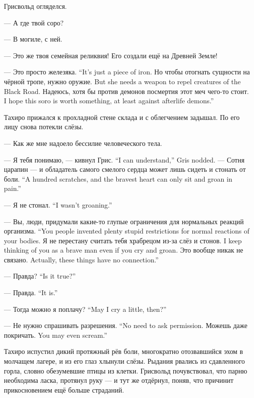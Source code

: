 Грисвольд огляделся.

--- А где твой соро?

--- В могиле, с ней.

--- Это же твоя семейная реликвия!
Его создали ещё на Древней Земле!

{--- Это просто железяка.}
{``It's just a piece of iron.}
{Но чтобы отогнать сущности на чёрной тропе, нужно оружие.}
{But she needs a weapon to repel creatures of the Black Road.}
{Надеюсь, хотя бы против демонов посмертия этот меч чего-то стоит.}
{I hope this soro is worth something, at least against afterlife demons.''}

Тахиро прижался к прохладной стене склада и с облегчением задышал.
По его лицу снова потекли слёзы.

--- Как же мне надоело бессилие человеческого тела.

{--- Я тебя понимаю, --- кивнул Грис.}
{``I can understand,'' Gris nodded.}
{--- Сотня царапин --- и обладатель самого смелого сердца может лишь сидеть и стонать от боли.}
{``A hundred scratches, and the bravest heart can only sit and groan in pain.''}

{--- Я не стонал.}
{``I wasn't groaning.''}

{--- Вы, люди, придумали какие-то глупые ограничения для нормальных реакций организма.}
{``You people invented plenty stupid restrictions for normal reactions of your bodies.}
{Я не перестану считать тебя храбрецом из-за слёз и стонов.}
{I keep thinking of you as a brave man even if you cry and groan.}
{Это вообще никак не связано.}
{Actually, these things have no connection.''}

{--- Правда?}
{``Is it true?''}

{--- Правда.}
{``It is.''}

{--- Тогда можно я поплачу?}
{``May I cry a little, then?''}

{--- Не нужно спрашивать разрешения.}
{``No need to ask permission.}
{Можешь даже покричать.}
{You may even scream.''}

Тахиро испустил дикий протяжный рёв боли, многократно отозвавшийся эхом в молчащем лагере, и из его глаз хлынули слёзы.
Рыдания рвались из сдавленного горла, словно обезумевшие птицы из клетки.
Грисвольд почувствовал, что парню необходима ласка, протянул руку --- и тут же отдёрнул, поняв, что причинит прикосновением ещё больше страданий.

